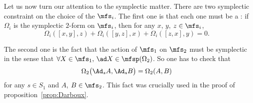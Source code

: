 Let us now turn our attention to the symplectic matter. There are two symplectic constraint on the choice of the $\mfs_i$. The first one is that each one must be a : if $\Omega_i$ is the symplectic $2$-form on $\mfs_i$, then for any $x$, $y$, $z\in\mfs_i$,
\begin{equation}\label{eq:symple_Lie}
	\Omega_i([x,y],z)+\Omega_i([y,z],x)+\Omega_i([z,x],y)=0.
\end{equation}

The second one is the fact that the action of $\mfs_1$ on $\mfs_2$ must be symplectic in the sense that
$\forall X\in\mfs_1,\, \ad X\in\mfsp (\Omega_2)$. So one has to check that
\begin{equation}
	\Omega_2\big(  \Ad_s A,\Ad_s B   \big)=\Omega_2(A,B)
\end{equation}
for any $s\in S_1$ and $A$, $B\in\mfs_2$. This fact was crucially used in the proof of proposition~\ref{prop:Darboux}.

